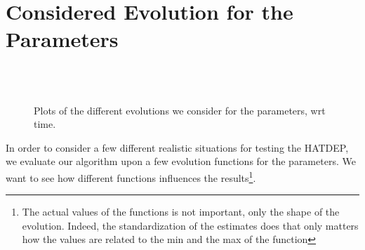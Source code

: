 \documentclass[11pt]{book}
\begin{document}
\section{Considered Evolution for the Parameters}
\begin{figure}
\centering
{}
\\
\\
\caption{Plots of the different evolutions we consider for the parameters, wrt time.}
\label{fig:evol_functions}
\end{figure}

In order to consider a few different realistic situations for testing the HATDEP, we evaluate our algorithm upon a few evolution functions for the parameters. We want to see how different functions influences the results\footnote{The actual values of the functions is not important, only the shape of the evolution. Indeed, the standardization of the estimates does that only matters how the values are related to the min and the max of the function}.
\end{document}
